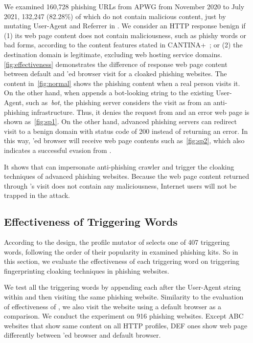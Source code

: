 We examined 160,728 phishing URLs from APWG from November 2020 to July 2021,
132,247 (82.28\%) of which do not contain malicious content, just by mutating User-Agent and Referrer in \spartacus.
We consider an HTTP response benign if (1) its web page content does not contain maliciousness, such as phishy words or bad forms, according to the content features stated in CANTINA+~\cite{xiang2011cantina+};
or (2) the destination domain is legitimate, excluding web hosting service domains.
\autoref{fig:effectiveness} demonstrates the difference of response web page content between default and \spartacus'ed browser visit for a cloaked phishing websites.
The content in~\autoref{fig:normal} shows the phishing content when a real person visits it.
On the other hand, when \spartacus appends a bot-looking string to the existing User-Agent, such as~\emph{bot}, the phishing server considers the visit as from an anti-phishing infrastructure.
Thus, it denies the request from \spartacus and an error web page is shown as~\autoref{fig:sp1}.
On the other hand, advanced phishing servers can redirect visit to a benign domain with status code of 200 instead of returning an error.
In this way, \spartacus'ed browser will receive web page contents such as~\autoref{fig:sp2},
which also indicates a successful evasion 
from \spartacus.

It shows that \spartacus can impersonate anti-phishing crawler and trigger the cloaking techniques of advanced phishing websites.
Because the web page content returned through \spartacus's visit does not contain any maliciousness, Internet users will not be trapped in the attack.



\subsection{Effectiveness of Triggering Words}

According to the design, the profile mutator of \spartacus selects one of 407 triggering words, following the order of their popularity in examined phishing kits.
So in this section, we evaluate the effectiveness of each triggering word on triggering fingerprinting cloaking techniques in phishing websites.

We test all the triggering words by appending each after the User-Agent string within \spartacus and then visiting the same phishing website.
Similarity to the evaluation of effectiveness of \spartacus, we also visit the website using a default browser as a comparison.
We conduct the experiment on 916 phishing websites.
Except ABC websites that show same content on all HTTP profiles,
DEF ones show web page differently between \spartacus'ed browser and default browser.

